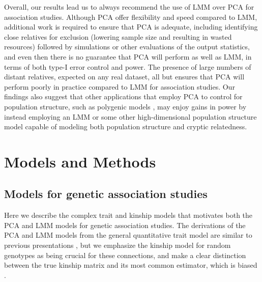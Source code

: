 \documentclass[11pt]{article}
\begin{document}
Overall, our results lead us to always recommend the use of LMM over PCA for association studies.
Although PCA offer flexibility and speed compared to LMM, additional work is required to ensure that PCA is adequate, including identifying close relatives for exclusion (lowering sample size and resulting in wasted resources) followed by simulations or other evaluations of the output statistics, and even then there is no guarantee that PCA will perform as well as LMM, in terms of both type-I error control and power.
The presence of large numbers of distant relatives, expected on any real dataset, all but ensures that PCA will perform poorly in practice compared to LMM for association studies.
Our findings also suggest that other applications that employ PCA to control for population structure, such as polygenic models \citep{qian_fast_2020}, may enjoy gains in power by instead employing an LMM or some other high-dimensional population structure model capable of modeling both population structure and cryptic relatedness.


\section{Models and Methods}

\subsection{Models for genetic association studies}

Here we describe the complex trait and kinship models that motivates both the PCA and LMM models for genetic association studies.
The derivations of the PCA and LMM models from the general quantitative trait model are similar to previous presentations \citep{astle_population_2009, hoffman_correcting_2013}, but we emphasize the kinship model for random genotypes as being crucial for these connections, and make a clear distinction between the true kinship matrix and its most common estimator, which is biased \citep{ochoa_estimating_2021, ochoa_human}.
\end{document}
